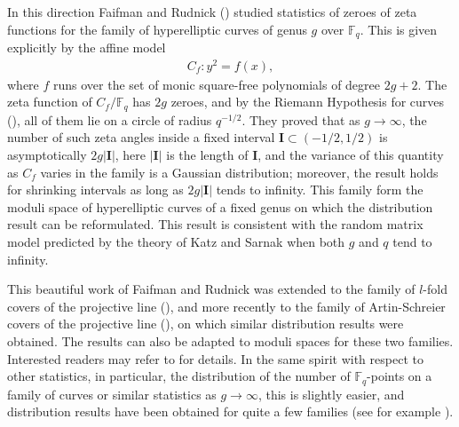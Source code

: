 \documentclass[12pt]{amsart}
\theoremstyle{plain}
\begin{document}
In this direction Faifman and Rudnick (\cite{fai}) studied statistics of zeroes of zeta functions for the family of hyperelliptic curves of genus $g$ over ${{\mathbb F}_q}$. This is given explicitly by the affine model
\begin{eqnarray} \label{1:cf} C_f: y^2=f(x), \end{eqnarray}
where $f$ runs over the set of monic square-free polynomials of degree $2g+2$. The zeta function of $C_f/{{\mathbb F}_q}$ has $2g$ zeroes, and by the Riemann Hypothesis for curves (\cite{wei}), all of them lie on a circle of radius $q^{-1/2}$. They proved that as $g \to \infty$, the number of such zeta angles inside a fixed interval ${{\mathbf I}} \subset (-1/2,1/2)$ is asymptotically $2g|{{\mathbf I}}|$, here $|{{\mathbf I}}|$ is the length of ${{\mathbf I}}$, and the variance of this quantity as $C_f$ varies in the family is a Gaussian distribution; moreover, the result holds for shrinking intervals as long as $2g|{{\mathbf I}}|$ tends to infinity. This family form the moduli space of hyperelliptic curves of a fixed genus on which the distribution result can be reformulated. This result is consistent with the random matrix model predicted by the theory of Katz and Sarnak when both $g$ and $q$ tend to infinity.

This beautiful work of Faifman and Rudnick was extended to the family of $l$-fold covers of the projective line (\cite{xio}), and more recently to the family of Artin-Schreier covers of the projective line (\cite{buc3}), on which similar distribution results were obtained. The results can also be adapted to moduli spaces for these two families. Interested readers may refer to \cite{xio,buc3} for details. In the same spirit with respect to other statistics, in particular, the distribution of the number of ${{\mathbb F}_q}$-points on a family of curves or similar statistics as $g \to \infty$, this is slightly easier, and distribution results have been obtained for quite a few families (see for example \cite{buc1,buc11,buc2,bk,ent,kur,kur2,woo1}).
\end{document}
